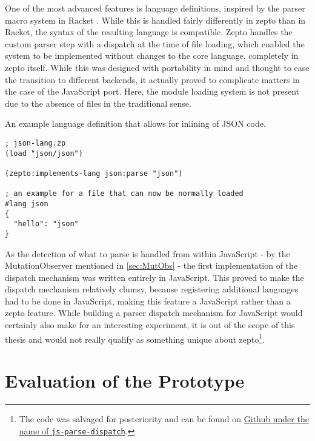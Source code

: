 \documentclass[oneside,11pt,xetex]{scrbook}
\begin{document}
One of the most advanced features is language definitions, inspired by
the parser macro system in Racket \parencite{RPM}. While this is handled
fairly differently in zepto than in Racket, the syntax of the resulting
language is compatible. Zepto handles the custom parser step with a dispatch
at the time of file loading, which enabled the system to be implemented without
changes to the core language, completely in zepto itself. While this was 
designed with portability in mind and thought to ease the transition to
different backends, it actually proved to complicate matters in the case
of the JavaScript port. Here, the module loading system is not present due
to the absence of files in the traditional sense.

\begin{listing}[H]
\caption{An example language definition that allows for inlining of JSON code.}
\begin{verbatim}
; json-lang.zp
(load "json/json")

(zepto:implements-lang json:parse "json")

; an example for a file that can now be normally loaded
#lang json
{
  "hello": "json"
}
\end{verbatim}
\end{listing}

As the detection of what to parse is handled from within JavaScript - by the
MutationObserver mentioned in \ref{sec:MutObs} - the first implementation
of the dispatch mechanism was written entirely in JavaScript. This proved
to make the dispatch mechanism relatively clumsy, because registering
additional languages had to be done in JavaScript, making this feature
a JavaScript rather than a zepto feature. While building a parser dispatch
mechanism for JavaScript would certainly also make for an interesting experiment,
it is out of the scope of this thesis and would not really qualify as something
unique about zepto\footnote{The code was salvaged for posteriority and can be
found on \href{https://github.com/hellerve/js-parse-dispatch}{Github under the
name of \texttt{js-parse-dispatch}}.}.

\chapter{Evaluation of the Prototype}
\label{chap:evaluation}
\end{document}
